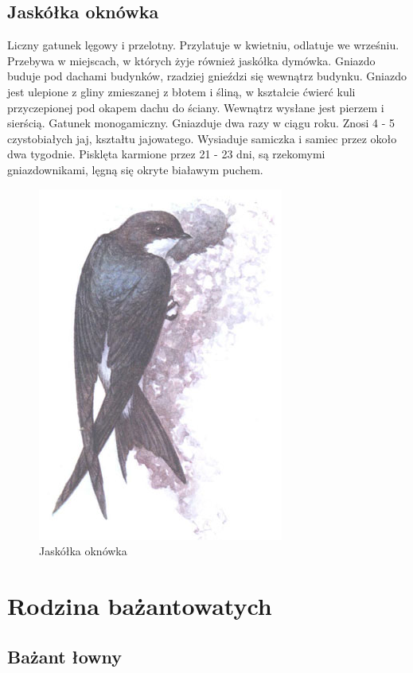 \documentclass[a4paper,12pt,twoside]{article}
\begin{document}
\subsection{Jaskółka oknówka}

Liczny gatunek lęgowy i przelotny. Przylatuje w kwietniu, odlatuje we wrześniu. Przebywa w miejscach, w których żyje również jaskółka dymówka. Gniazdo buduje pod dachami budynków, rzadziej gnieździ się wewnątrz budynku. Gniazdo jest ulepione z gliny zmieszanej z błotem i śliną, w kształcie ćwierć kuli przyczepionej pod okapem dachu do ściany. Wewnątrz wysłane jest pierzem i sierścią. Gatunek monogamiczny. Gniazduje dwa razy w ciągu roku. Znosi 4 - 5 czystobiałych jaj, kształtu jajowatego. Wysiaduje samiczka i samiec przez około dwa tygodnie. Pisklęta karmione przez 21 - 23 dni, są rzekomymi gniazdownikami, lęgną się okryte białawym puchem. 

\begin{figure}
\centerline{\includegraphics[scale=0.5]{jaskolka-oknowka}}
\caption{Jaskółka oknówka}
\end{figure}

\section{Rodzina bażantowatych}

\subsection{Bażant łowny}
\end{document}
